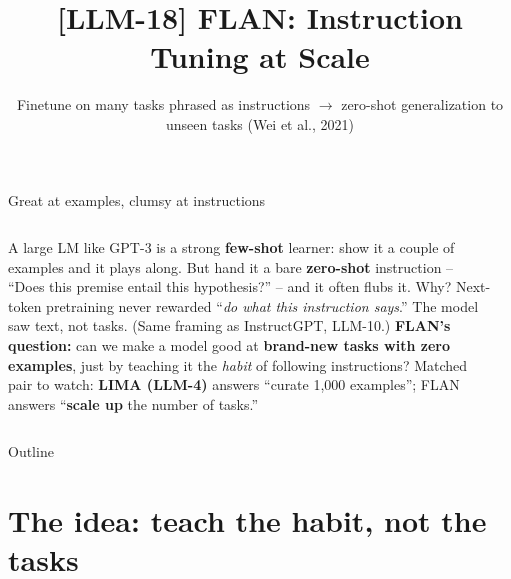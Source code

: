 \documentclass[aspectratio=169]{beamer}
\title{[LLM-18] FLAN: Instruction Tuning at Scale}
\subtitle{Finetune on many tasks phrased as instructions $\to$ zero-shot generalization to unseen tasks \quad(Wei et al., 2021)}
\date{}
\begin{document}
\begin{frame}{Great at examples, clumsy at instructions}
  \begin{columns}[T]
    A large LM like GPT-3 is a strong \textbf{few-shot} learner: show it a couple of
    examples and it plays along. But hand it a bare \textbf{zero-shot} instruction -- ``Does
    this premise entail this hypothesis?'' -- and it often flubs it.
    \vskip 3pt
    Why? Next-token pretraining never rewarded ``\emph{do what this instruction says}.'' The
    model saw text, not tasks. (Same framing as InstructGPT, LLM-10.)
    \vskip 3pt
    \textbf{FLAN's question:} can we make a model good at \textbf{brand-new tasks with zero
    examples}, just by teaching it the \emph{habit} of following instructions?
    \vskip 3pt
    {\footnotesize Matched pair to watch: \textbf{LIMA (LLM-4)} answers ``curate 1{,}000
    examples''; FLAN answers ``\textbf{scale up} the number of tasks.''}
    \begin{center}
    \end{center}
  \end{columns}
\end{frame}

\begin{frame}{Outline}
  \tableofcontents
\end{frame}

\section{The idea: teach the habit, not the tasks}
\end{document}
